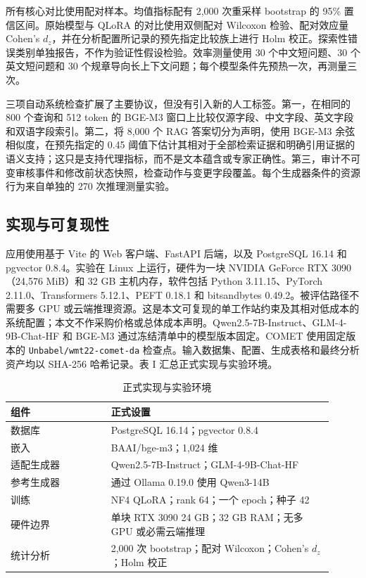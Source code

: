 所有核心对比使用配对样本。均值指标配有 2,000 次重采样 bootstrap 的 95\% 置信区间。原始模型与 QLoRA 的对比使用双侧配对 Wilcoxon 检验、配对效应量 Cohen's $d_z$，并在分析配置所记录的预先指定比较族上进行 Holm 校正。探索性错误类别单独报告，不作为验证性假设检验。效率测量使用 30 个中文短问题、30 个英文短问题和 30 个规章导向长上下文问题；每个模型条件先预热一次，再测量三次。

三项自动系统检查扩展了主要协议，但没有引入新的人工标签。第一，在相同的 800 个查询和 512 token 的 BGE-M3 窗口上比较仅源字段、中文字段、英文字段和双语字段索引。第二，将 8,000 个 RAG 答案切分为声明，使用 BGE-M3 余弦相似度，在预先指定的 0.45 阈值下估计其相对于全部检索证据和明确引用证据的语义支持；这只是支持代理指标，而不是文本蕴含或专家正确性。第三，审计不可变审核事件和修改前状态快照，检查动作与变更字段覆盖。每个生成器条件的资源行为来自单独的 270 次推理测量实验。

\subsection{实现与可复现性}

应用使用基于 Vite 的 Web 客户端、FastAPI 后端，以及 PostgreSQL 16.14 和 pgvector 0.8.4。实验在 Linux 上运行，硬件为一块 NVIDIA GeForce RTX 3090（24,576 MiB）和 32 GB 主机内存，软件包括 Python 3.11.15、PyTorch 2.11.0、Transformers 5.12.1、PEFT 0.18.1 和 bitsandbytes 0.49.2。被评估路径不需要多 GPU 或云端推理资源。这是本文可复现的单工作站约束及其相对低成本的系统配置；本文不作采购价格或总体成本声明。Qwen2.5-7B-Instruct、GLM-4-9B-Chat-HF 和 BGE-M3 通过冻结清单中的模型版本固定。COMET 使用固定版本的 \texttt{Unbabel/wmt22-comet-da} 检查点。输入数据集、配置、生成表格和最终分析资产均以 SHA-256 哈希记录。表 I 汇总正式实现与实验环境。

\begin{table}[ht]
\centering
\caption{正式实现与实验环境}
\begin{tabular}{p{0.29\linewidth}p{0.62\linewidth}}
\toprule
组件 & 正式设置 \\
\midrule
数据库 & PostgreSQL 16.14；pgvector 0.8.4 \\
嵌入 & BAAI/bge-m3；1,024 维 \\
适配生成器 & Qwen2.5-7B-Instruct；GLM-4-9B-Chat-HF \\
参考生成器 & 通过 Ollama 0.19.0 使用 Qwen3-14B \\
训练 & NF4 QLoRA；rank 64；一个 epoch；种子 42 \\
硬件边界 & 单块 RTX 3090 24 GB；32 GB RAM；无多 GPU 或必需云端推理 \\
统计分析 & 2,000 次 bootstrap；配对 Wilcoxon；Cohen's $d_z$；Holm 校正 \\
\bottomrule
\end{tabular}
\end{table}

